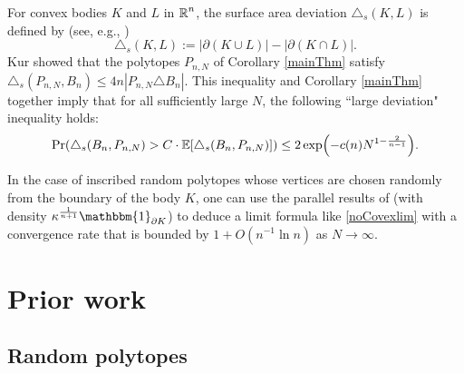 \begin{remark}
	For convex bodies $K$ and $L$ in $\operatorname{\mathbb{R}}^n$, the surface area deviation $\triangle_s(K,L)$ is defined by (see, e.g., \cite{Wer15,kur2017approximation})
	\[
	\triangle_s(K,L) := |\partial (K\cup L)| - |\partial (K\cap L)|.
	\]
	Kur \cite{kur2017approximation} showed that the polytopes $P_{n,N}$ of Corollary \ref{mainThm} satisfy $\triangle_s(P_{n,N},B_n) \leq 4n|P_{n,N}\triangle B_n|$. %
This inequality and Corollary \ref{mainThm} together imply that for all sufficiently large $N$, the following ``large deviation" inequality holds:
	\[
	\Pr\left( \triangle_s(B_n,P_{n,N}) > C \cdot \E\left[\triangle_s(B_n,P_{n,N})\right] \right) \leq 2 \exp\left(-c(n)N^{1-\frac{2}{n-1}}\right).
	\]
\end{remark}
\begin{remark}
	In the case of inscribed random polytopes whose vertices are chosen randomly from the boundary of the body $K$, one can use the parallel results of \cite{MaS2,schutt2003polytopes} (with density $\kappa^{\frac{1}{n+1}}\mathbbm{1}_{\partial K}$) to deduce a limit formula like \eqref{noCovexlim} with a convergence rate that is bounded by $ 1+O(n^{-1}\ln n)$ as $N\to\infty$.
\end{remark}
\section{Prior work}

\subsection{Random polytopes} 

